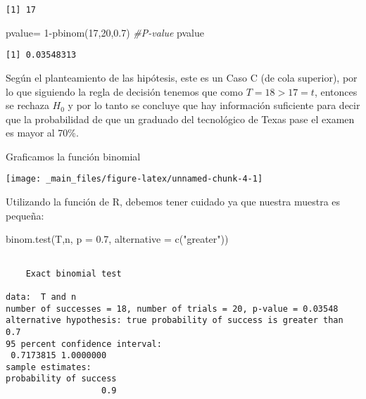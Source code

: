 \documentclass[
  a4paper,
  oneside,
  openany]{book}
\newenvironment{Shaded}{\begin{snugshade}}{\end{snugshade}}
\newcommand{\AttributeTok}[1]{\textcolor[rgb]{0.77,0.63,0.00}{#1}}
\newcommand{\CommentTok}[1]{\textcolor[rgb]{0.56,0.35,0.01}{\textit{#1}}}
\newcommand{\DecValTok}[1]{\textcolor[rgb]{0.00,0.00,0.81}{#1}}
\newcommand{\FloatTok}[1]{\textcolor[rgb]{0.00,0.00,0.81}{#1}}
\newcommand{\FunctionTok}[1]{\textcolor[rgb]{0.00,0.00,0.00}{#1}}
\newcommand{\NormalTok}[1]{#1}
\newcommand{\OtherTok}[1]{\textcolor[rgb]{0.56,0.35,0.01}{#1}}
\newcommand{\SpecialCharTok}[1]{\textcolor[rgb]{0.00,0.00,0.00}{#1}}
\newcommand{\StringTok}[1]{\textcolor[rgb]{0.31,0.60,0.02}{#1}}
\begin{document}
\begin{verbatim}
[1] 17
\end{verbatim}

\begin{Shaded}
\begin{Highlighting}[]
\NormalTok{pvalue}\OtherTok{=} \DecValTok{1}\SpecialCharTok{{-}}\FunctionTok{pbinom}\NormalTok{(}\DecValTok{17}\NormalTok{,}\DecValTok{20}\NormalTok{,}\FloatTok{0.7}\NormalTok{)                }\CommentTok{\#P{-}value}
\NormalTok{pvalue}
\end{Highlighting}
\end{Shaded}

\begin{verbatim}
[1] 0.03548313
\end{verbatim}

Según el planteamiento de las hipótesis, este es un Caso C (de cola superior), por lo que siguiendo la regla de decisión tenemos que como \(T=18>17=t\), entonces se rechaza \(H_0\) y por lo tanto se concluye que hay información suficiente para decir que la probabilidad de que un graduado del tecnológico de Texas pase el examen es mayor al 70\%.

Graficamos la función binomial

\begin{center}\texttt{[image: \_main\_files/figure-latex/unnamed-chunk-4-1]} \end{center}

Utilizando la función de R, debemos tener cuidado ya que nuestra muestra es pequeña:

\begin{Shaded}
\begin{Highlighting}[]
\FunctionTok{binom.test}\NormalTok{(T,n, }\AttributeTok{p =} \FloatTok{0.7}\NormalTok{, }\AttributeTok{alternative =} \FunctionTok{c}\NormalTok{(}\StringTok{"greater"}\NormalTok{))}
\end{Highlighting}
\end{Shaded}

\begin{verbatim}

    Exact binomial test

data:  T and n
number of successes = 18, number of trials = 20, p-value = 0.03548
alternative hypothesis: true probability of success is greater than 0.7
95 percent confidence interval:
 0.7173815 1.0000000
sample estimates:
probability of success 
                   0.9 
\end{verbatim}
\end{document}
